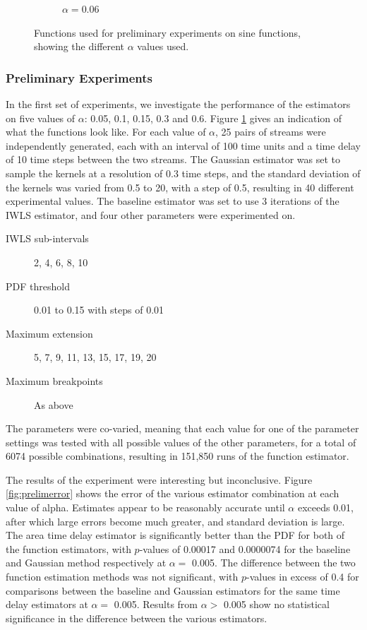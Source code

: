 \documentclass[a4paper,11pt]{article}
\begin{document}
\begin{figure}
\begin{center}
\begin{subfigure}{0.5\textwidth}
\caption{$\alpha=0.06$}
\end{subfigure}
\end{center}
\caption{Functions used for preliminary experiments on sine functions, showing
the different $\alpha$ values used.}
\label{fig:avals}
\end{figure}
\subsubsection{Preliminary Experiments}
\label{sec-7-1-1}

In the first set of experiments, we investigate the performance of the
estimators on five values of $\alpha$: 0.05, 0.1, 0.15, 0.3 and 0.6. Figure
\ref{fig:avals} gives an indication of what the functions look like. For
each value of $\alpha$, 25 pairs of streams were independently generated, each
with an interval of 100 time units and a time delay of 10 time steps between the
two streams. The Gaussian estimator was set to sample the kernels at a
resolution of 0.3 time steps, and the standard deviation of the kernels was
varied from 0.5 to 20, with a step of 0.5, resulting in 40 different
experimental values. The baseline estimator was set to use 3 iterations of the
IWLS estimator, and four other parameters were experimented on.
\begin{description}
\item[IWLS sub-intervals] 2, 4, 6, 8, 10
\item[PDF threshold] 0.01 to 0.15 with steps of 0.01
\item[Maximum extension] 5, 7, 9, 11, 13, 15, 17, 19, 20
\item[Maximum breakpoints] As above
\end{description}
The parameters were co-varied, meaning that each value for one
of the parameter settings was tested with all possible values of the other
parameters, for a total of 6074 possible combinations, resulting in 151,850 runs
of the function estimator.



The results of the experiment were interesting but inconclusive. Figure
\ref{fig:prelimerror} shows the error of the various estimator combination at
each value of alpha. Estimates appear to be reasonably accurate until $\alpha$
exceeds 0.01, after which large errors become much greater, and standard
deviation is large. The area time delay estimator is significantly better than
the PDF for both of the function estimators, with $p$-values of 0.00017 and
0.0000074 for the baseline and Gaussian method respectively at
$\alpha=$ 0.005. The difference between the two function estimation methods was
not significant, with $p$-values in excess of 0.4 for comparisons between the
baseline and Gaussian estimators for the same time delay estimators at
$\alpha=$ 0.005. Results from $\alpha>$ 0.005 show no statistical significance in
the difference between the various estimators.
\end{document}
